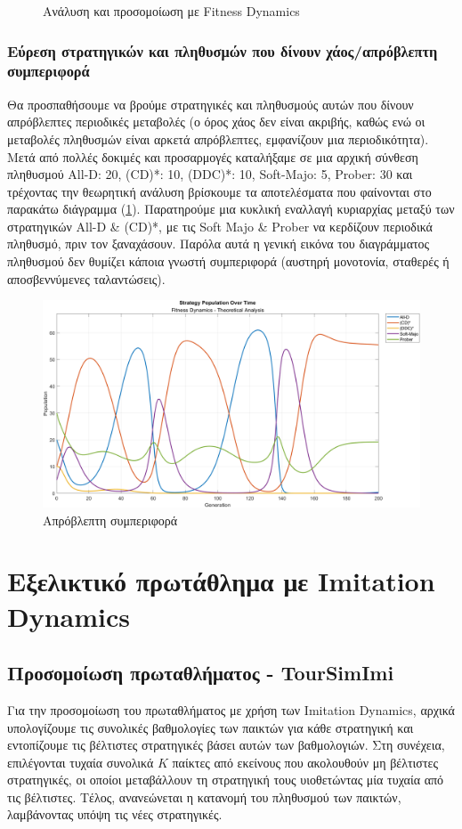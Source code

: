 \documentclass[a4paper,12pt]{article}
\begin{document}
\begin{figure}[h!]
\caption{Ανάλυση και προσομοίωση με \foreignlanguage{english}{Fitness Dynamics}}
\end{figure}

\subsubsection*{Εύρεση στρατηγικών και πληθυσμών που δίνουν χάος/απρόβλεπτη συμπεριφορά}
Θα προσπαθήσουμε να βρούμε στρατηγικές και πληθυσμούς αυτών που δίνουν απρόβλεπτες περιοδικές μεταβολές (ο όρος χάος δεν είναι ακριβής, καθώς ενώ οι μεταβολές πληθυσμών είναι αρκετά απρόβλεπτες, εμφανίζουν μια περιοδικότητα).
Μετά από πολλές δοκιμές και προσαρμογές καταλήξαμε σε μια αρχική σύνθεση πληθυσμού \foreignlanguage{english}{All-D: 20, (CD)*: 10, (DDC)*: 10, Soft-Majo: 5, Prober: 30} και τρέχοντας την θεωρητική ανάλυση βρίσκουμε τα αποτελέσματα που φαίνονται στο παρακάτω διάγραμμα (\ref{fig:disordered_os}).
Παρατηρούμε μια κυκλική εναλλαγή κυριαρχίας μεταξύ των στρατηγικών \foreignlanguage{english}{All-D \& (CD)*}, με τις \foreignlanguage{english}{Soft Majo \& Prober} να κερδίζουν περιοδικά πληθυσμό, πριν τον ξαναχάσουν. Παρόλα αυτά η γενική εικόνα του διαγράμματος πληθυσμού δεν θυμίζει κάποια γνωστή συμπεριφορά (αυστηρή μονοτονία, σταθερές ή αποσβεννύμενες ταλαντώσεις).
\begin{figure}[H]
    \centering
    \includegraphics[width=0.8\linewidth]{Graphs/disordered_osc.png}
    \caption{Απρόβλεπτη συμπεριφορά}
    \label{fig:disordered_os}
\end{figure}

\section{Εξελικτικό πρωτάθλημα με \foreignlanguage{english}{Imitation Dynamics}}
\subsection{Προσομοίωση πρωταθλήματος\foreignlanguage{english}{ - TourSimImi}}
Για την προσομοίωση του πρωταθλήματος με χρήση των \foreignlanguage{english}{Imitation Dynamics}, αρχικά υπολογίζουμε τις συνολικές βαθμολογίες των παικτών για κάθε στρατηγική και εντοπίζουμε τις βέλτιστες στρατηγικές βάσει αυτών των βαθμολογιών. Στη συνέχεια, επιλέγονται τυχαία συνολικά $K$ παίκτες από εκείνους που ακολουθούν μη βέλτιστες στρατηγικές, οι οποίοι μεταβάλλουν τη στρατηγική τους υιοθετώντας μία τυχαία από τις βέλτιστες. Τέλος, ανανεώνεται η κατανομή του πληθυσμού των παικτών, λαμβάνοντας υπόψη τις νέες στρατηγικές.
\end{document}
